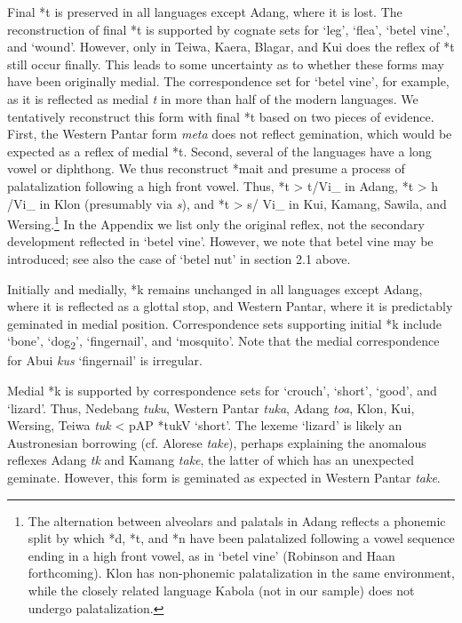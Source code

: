 Final *t is preserved in all languages except Adang, where it is lost. The reconstruction of final *t is supported by cognate sets for `leg', `flea', `betel vine', and `wound'. However, only in Teiwa, Kaera, Blagar, and Kui does the reflex of *t still occur finally. This leads to some uncertainty as to whether these forms may have been originally medial. The correspondence set for `betel vine', for example, as it is reflected as medial \textit{t} in more than half of the modern languages. We tentatively reconstruct this form with final *t based on two pieces of evidence. First, the Western Pantar form \textit{meta} does not reflect gemination, which would be expected as a reflex of medial *t. Second, several of the languages have a long vowel or diphthong. We thus reconstruct *mait and presume a process of palatalization following a high front vowel. Thus, *t {\textgreater} t{\textesh}/Vi\_ in Adang, *t {\textgreater} h /Vi\_ in Klon (presumably via \textit{s}), and *t {\textgreater} s/ Vi\_ in Kui, Kamang,
Sawila, and Wersing.\footnote{ The alternation between alveolars and palatals in Adang reflects a phonemic split by which *d, *t, and *n have been palatalized following a vowel sequence ending in a high front vowel, as in `betel vine' (Robinson and Haan forthcoming). Klon has non-phonemic palatalization in the same environment, while the closely related language Kabola (not in our sample) does not undergo palatalization.} In the Appendix we list only the original reflex, not the secondary development reflected in `betel vine'. However, we note that betel vine may be introduced; see also the case of `betel nut' in section 2.1 above.

Initially and medially, *k remains unchanged in all languages except Adang, where it is reflected as a glottal stop, and Western Pantar, where it is predictably geminated in medial position. Correspondence sets supporting initial *k include `bone', `dog\textsubscript{2}', `fingernail', and `mosquito'. Note that the medial correspondence for Abui \textit{kus{\textsci}{\ng}} `fingernail' is irregular.

Medial *k is supported by correspondence sets for `crouch', `short', `good', and `lizard'. Thus, Nedebang \textit{tuku}, Western Pantar \textit{tuk{\textlengthmark}a}, Adang \textit{to{\textglotstop}a{\ng}}, Klon, Kui, Wersing, Teiwa \textit{tuk }{\textless} pAP *tukV `short'. The lexeme `lizard' is likely an Austronesian borrowing (cf. Alorese \textit{take}), perhaps explaining the anomalous reflexes Adang \textit{t{\textepsilon}k{\textopeno}} and Kamang \textit{tak{\textlengthmark}e{\textlengthmark}}, the latter of which has an unexpected geminate\textit{. }However, this form is geminated as expected in Western Pantar \textit{tak{\textlengthmark}e}.

